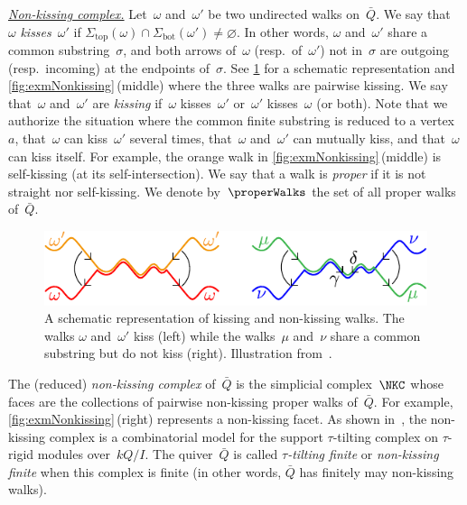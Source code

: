 \documentclass{amsart}
\theoremstyle{definition}
\newcommand{\darkblue}{\color{darkblue}} %
\newcommand{\defn}[1]{\textsl{\darkblue #1}} %
\newcommand{\para}[1]{\medskip\noindent\uline{\textit{#1.}}} %
\newcommand{\quiver}{\bar Q} %
\renewcommand{\top}{\mathrm{top}} %
\newcommand{\bottom}{\mathrm{bot}} %
\begin{document}
\para{Non-kissing complex}
%
Let~$\omega$ and~$\omega'$ be two undirected walks on~$\quiver$.
We say that~$\omega$ \defn{kisses}~$\omega'$ if ${\Sigma_\top(\omega) \cap \Sigma_\bottom(\omega')} \ne \varnothing$.
In other words, $\omega$ and~$\omega'$ share a common substring~$\sigma$, and both arrows of~$\omega$ (resp.~of~$\omega'$) not in~$\sigma$ are outgoing (resp.~incoming) at the endpoints of~$\sigma$.
See \cref{fig:kissingCrossing} for a schematic representation and \cref{fig:exmNonkissing}\,(middle) where the three walks are pairwise kissing.
We say that~$\omega$ and~$\omega'$ are \defn{kissing} if~$\omega$ kisses~$\omega'$ or~$\omega'$ kisses~$\omega$ (or both).
Note that we authorize the situation where the common finite substring is reduced to a vertex~$a$, that~$\omega$ can kiss~$\omega'$ several times, that~$\omega$ and~$\omega'$ can mutually kiss, and that~$\omega$ can kiss itself.
For example, the orange walk in \cref{fig:exmNonkissing}\,(middle) is self-kissing (at its self-intersection).
We say that a walk is \defn{proper} if it is not straight nor self-kissing.
We denote by~$\properWalks$ the set of all proper walks of~$\quiver$.

\begin{figure}[h]
	\capstart
	\centerline{\includegraphics[scale=1]{kissingCrossing}}
	\caption{A schematic representation of kissing and non-kissing walks. The walks $\omega$ and~$\omega'$ kiss (left) while the walks~$\mu$ and~$\nu$ share a common substring but do not kiss (right). Illustration from~\cite{PaluPilaudPlamondon-nonkissing}.}
	\label{fig:kissingCrossing}
\end{figure}

The (reduced) \defn{non-kissing complex} of~$\quiver$ is the simplicial complex~$\NKC$ whose faces are the collections of pairwise non-kissing proper walks of~$\quiver$.
For example, \cref{fig:exmNonkissing}\,(right) represents a non-kissing facet.
As shown in~\cite[Thm.~2.46]{PaluPilaudPlamondon-nonkissing}, the non-kissing complex is a combinatorial model for the support $\tau$-tilting complex on $\tau$-rigid modules over~$kQ/I$.
The quiver~$\quiver$ is called \defn{$\tau$-tilting finite} or \defn{non-kissing finite} when this complex is finite (in other words, $\quiver$ has finitely may non-kissing walks).
\end{document}
